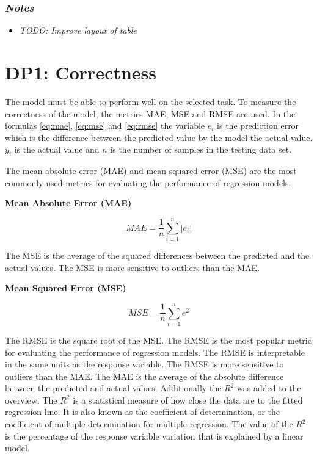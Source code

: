 \subsubsection*{\textit{Notes}}

\begin{itemize}
    \item \textit{TODO: Improve layout of table}
\end{itemize}


\section{DP1: Correctness}\label{sec:dp2:-correctness}
The model must be able to perform well on the selected task.
To measure the correctness of the model, the metrics MAE, MSE and RMSE are used.
In the formulas \ref{eq:mae}, \ref{eq:mse} and \ref{eq:rmse} the variable $e_i$ is the prediction
error which is the difference between the predicted value by the model the actual value.
$y_i$ is the actual value and $n$ is the number of samples in the testing data set.

The mean absolute error (MAE) and mean squared error (MSE) are the most commonly used metrics for
evaluating the performance of regression models.

\textbf{Mean Absolute Error (MAE)}
\begin{tcolorbox}[arc=0pt,boxrule=0.5pt]
    \begin{equation}
        \label{eq:mae}
        MAE = \frac{1}{n} \sum_{i=1}^{n} |e_i|
    \end{equation}
\end{tcolorbox}

The MSE is the average of the squared differences between the predicted and the actual values.
The MSE is more sensitive to outliers than the MAE.

\textbf{Mean Squared Error (MSE)}

\begin{tcolorbox}[arc=0pt,boxrule=0.5pt]
    \begin{equation}
        \label{eq:mse}
        MSE = \frac{1}{n} \sum_{i=1}^{n} e^2
    \end{equation}
\end{tcolorbox}

The RMSE is the square root of the MSE. The RMSE is the most popular metric for evaluating the
performance of regression models. The RMSE is interpretable in the same units as the response
variable. The RMSE is more sensitive to outliers than the MAE.
The MAE is the average of the absolute difference between the predicted and actual values.
Additionally the $R^2$ was added to the overview. The $R^2$ is a statistical measure of how close
the data are to the fitted regression line. It is also known as the coefficient of determination,
or the coefficient of multiple determination for multiple regression. The value of the $R^2$ is
the percentage of the response variable variation that is explained by a linear model.

